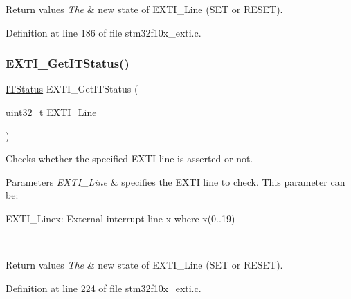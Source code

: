 \begin{DoxyRetVals}{Return values}
{\em The} & new state of E\+X\+T\+I\+\_\+\+Line (S\+ET or R\+E\+S\+ET). \\
\hline
\end{DoxyRetVals}


Definition at line 186 of file stm32f10x\+\_\+exti.\+c.

\mbox{\label{group___e_x_t_i___exported___functions_gaf7b51519062ae42fd27ee689cab364aa}} 
\subsubsection{\texorpdfstring{E\+X\+T\+I\+\_\+\+Get\+I\+T\+Status()}{EXTI\_GetITStatus()}}
{\footnotesize\ttfamily \hyperlink{group___exported__types_gaacbd7ed539db0aacd973a0f6eca34074}{I\+T\+Status} E\+X\+T\+I\+\_\+\+Get\+I\+T\+Status (\begin{DoxyParamCaption}\item[{uint32\+\_\+t}]{E\+X\+T\+I\+\_\+\+Line }\end{DoxyParamCaption})}



Checks whether the specified E\+X\+TI line is asserted or not. 


\begin{DoxyParams}{Parameters}
{\em E\+X\+T\+I\+\_\+\+Line} & specifies the E\+X\+TI line to check. This parameter can be\+: \begin{DoxyItemize}
\item E\+X\+T\+I\+\_\+\+Linex\+: External interrupt line x where x(0..19) \end{DoxyItemize}
\\
\hline
\end{DoxyParams}

\begin{DoxyRetVals}{Return values}
{\em The} & new state of E\+X\+T\+I\+\_\+\+Line (S\+ET or R\+E\+S\+ET). \\
\hline
\end{DoxyRetVals}


Definition at line 224 of file stm32f10x\+\_\+exti.\+c.

